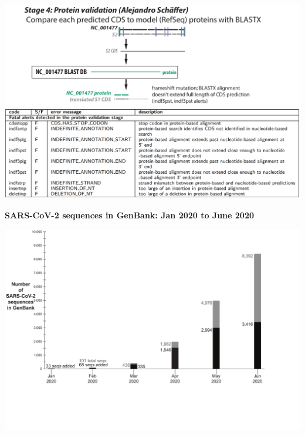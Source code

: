 \documentclass[landscape]{slides}
\begin{document}
\begin{slide}
\begin{center}

\includegraphics[width=10.5in]{figs/v-annotate-stage4-2}
\includegraphics[width=10.5in]{figs/ss-protein-alert-list}

\end{center}
\vfill
\end{slide}
\begin{slide}
\begin{center}
\textbf{SARS-CoV-2 sequences in GenBank: Jan 2020 to June 2020}

\includegraphics[width=10.5in]{figs/sars-counts-jan2020-may2020-slide1}
\end{center}

\vfill
\end{slide}
\end{document}
